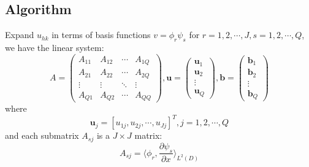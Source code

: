 \subsection{Algorithm}
Expand $u_{hk}$ in terms of basis functions $v = \phi_r \psi_s$ for $r=1,2,\cdots, J, s=1,2,\cdots, Q$, we have the linear system:
\begin{equation}
    A = \begin{pmatrix}
        A_{11} & A_{12} & \cdots & A_{1Q}\\
        A_{21} & A_{22} & \cdots & A_{2Q}\\
        \vdots & \vdots & \ddots & \vdots\\
        A_{Q1} & A_{Q2} & \cdots & A_{QQ}
    \end{pmatrix},
    \mathbf{u} = \begin{pmatrix}
        \mathbf{u}_1\\
        \mathbf{u}_2\\
        \vdots\\
        \mathbf{u}_Q
    \end{pmatrix},
    \mathbf{b} = \begin{pmatrix}
        \mathbf{b}_1\\
        \mathbf{b}_2\\
        \vdots\\
        \mathbf{b}_Q
    \end{pmatrix}
\end{equation}
where
\begin{equation}
    \mathbf{u}_j = [u_{1j}, u_{2j}, \cdots, u_{Jj}]^T, j=1,2,\cdots, Q
\end{equation}
and each submatrix $A_{sj}$ is a $J\times J$ matrix:
\begin{equation}
    A_{sj} = \langle \phi_r, \frac{\partial \psi_s}{\partial x}\rangle_{L^2(D)}
\end{equation}






















